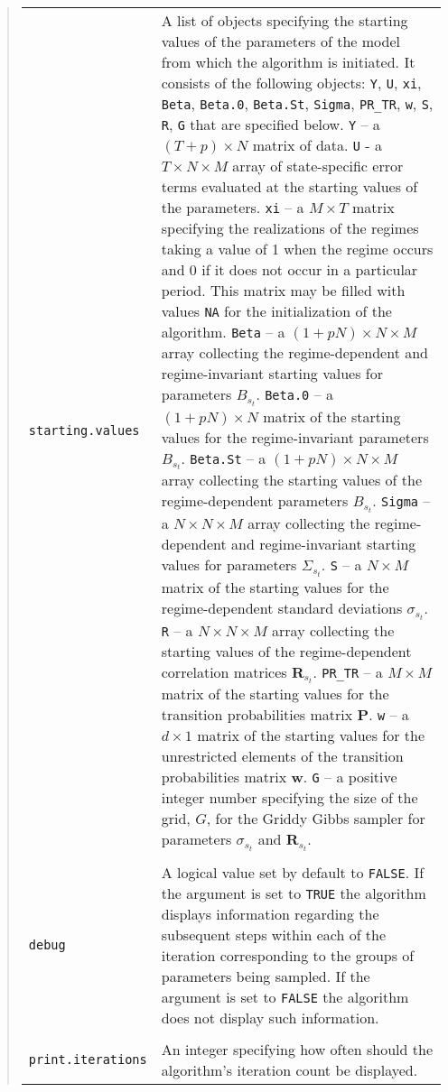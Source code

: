 \documentclass[final,3p,authoryear]{elsarticle}
\begin{document}
\begin{quote}
\begin{tabular}{p{3cm}p{10cm}}
\texttt{starting.values}& A list of objects specifying the starting values of the parameters of the model from which the algorithm is initiated. It consists of the following objects: \texttt{Y}, \texttt{U}, \texttt{xi}, \texttt{Beta}, \texttt{Beta.0}, \texttt{Beta.St}, \texttt{Sigma}, \texttt{PR\_TR}, \texttt{w}, \texttt{S}, \texttt{R}, \texttt{G} that are specified below.
\linebreak
\texttt{Y} -- a $(T+p)\times N$ matrix of data. 
\texttt{U} - a $T\times N \times M$ array of state-specific error terms evaluated at the starting values of the parameters.
\texttt{xi} -- a $M\times T$ matrix specifying the realizations of the regimes taking a value of 1 when the regime occurs and 0 if it does not occur in a particular period. This matrix may be filled with values \texttt{NA} for the initialization of the algorithm.
\texttt{Beta} -- a $(1+pN)\times N \times M$ array collecting the regime-dependent and regime-invariant starting values for parameters $B_{s_t}$.
\texttt{Beta.0} -- a $(1+pN)\times N$ matrix of the starting values for the regime-invariant parameters $B_{s_t}$.
\texttt{Beta.St} -- a $(1+pN)\times N \times M$ array collecting the starting values of the regime-dependent parameters $B_{s_t}$.
\texttt{Sigma} -- a $N\times N \times M$ array collecting the regime-dependent and regime-invariant starting values for parameters $\Sigma_{s_t}$.
\texttt{S} -- a $N\times M$ matrix of the starting values for the regime-dependent standard deviations $\sigma_{s_t}$.
\texttt{R} -- a $N\times N \times M$ array collecting the starting values of the regime-dependent correlation matrices $\mathbf{R}_{s_t}$.
\texttt{PR\_TR}  -- a $M\times M$ matrix of the starting values for the transition probabilities matrix $\mathbf{P}$.
\texttt{w} -- a $d\times 1$ matrix of the starting values for the unrestricted elements of the transition probabilities matrix $\mathbf{w}$.
\texttt{G} -- a positive integer number specifying the size of the grid, $G$, for the Griddy Gibbs sampler for parameters $\sigma_{s_t}$ and $\mathbf{R}_{s_t}$.
\\
&\\
\texttt{debug}& A logical value set by default to \texttt{FALSE}. If the argument is set to \texttt{TRUE} the algorithm displays information regarding the subsequent steps within each of the iteration corresponding to the groups of parameters being sampled. If the argument is set to \texttt{FALSE} the algorithm does not display such information. \\
&\\
\texttt{print.iterations}& An integer specifying how often should the algorithm's iteration count be displayed.
\end{tabular}
\end{quote}
\end{document}
